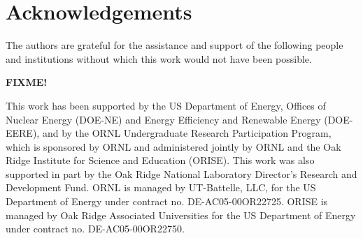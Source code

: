 \section{Acknowledgements}
The authors are grateful for the assistance and support of the following people
and institutions without which this work would not have been possible.

\textbf{FIXME!}

This work has been supported by the US Department of Energy, Offices of Nuclear
Energy (DOE-NE) and Energy Efficiency and Renewable Energy (DOE-EERE), and by
the ORNL Undergraduate Research Participation Program, which is sponsored by
ORNL and administered jointly by ORNL and the Oak Ridge Institute for Science
and Education (ORISE). This work was also supported in part by the Oak Ridge
National Laboratory Director's Research and Development Fund. ORNL is managed by
UT-Battelle, LLC, for the US Department of Energy under contract no.
DE-AC05-00OR22725. ORISE is managed by Oak Ridge Associated Universities for
the US Department of Energy under contract no. DE-AC05-00OR22750.